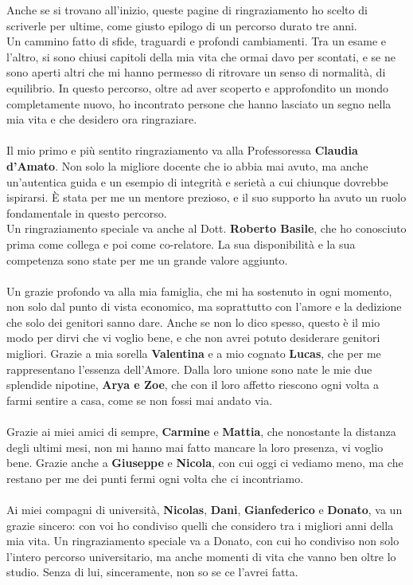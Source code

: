 Anche se si trovano all'inizio, queste pagine di ringraziamento ho scelto di scriverle per ultime, come giusto epilogo di un percorso durato tre anni.
\\
Un cammino fatto di sfide, traguardi e profondi cambiamenti. Tra un esame e l’altro, si sono chiusi capitoli della mia vita che ormai davo per scontati, e se ne sono aperti altri che mi hanno permesso di ritrovare un senso di normalità, di equilibrio.
In questo percorso, oltre ad aver scoperto e approfondito un mondo completamente nuovo, ho incontrato persone che hanno lasciato un segno nella mia vita e che desidero ora ringraziare.
\\\\
Il mio primo e più sentito ringraziamento va alla Professoressa \textbf{Claudia d’Amato}. Non solo la migliore docente che io abbia mai avuto, ma anche un'autentica guida e un esempio di integrità e serietà a cui chiunque dovrebbe ispirarsi. È stata per me un mentore prezioso, e il suo supporto ha avuto un ruolo fondamentale in questo percorso.
\\
Un ringraziamento speciale va anche al Dott. \textbf{Roberto Basile}, che ho conosciuto prima come collega e poi come co-relatore. La sua disponibilità e la sua competenza sono state per me un grande valore aggiunto.
\\\\
Un grazie profondo va alla mia famiglia, che mi ha sostenuto in ogni momento, non solo dal punto di vista economico, ma soprattutto con l'amore e la dedizione che solo dei genitori sanno dare. Anche se non lo dico spesso, questo è il mio modo per dirvi che vi voglio bene, e che non avrei potuto desiderare genitori migliori.
Grazie a mia sorella \textbf{Valentina} e a mio cognato \textbf{Lucas}, che per me rappresentano l'essenza dell'Amore.
Dalla loro unione sono nate le mie due splendide nipotine, \textbf{Arya e Zoe}, che con il loro affetto riescono ogni volta a farmi sentire a casa, come se non fossi mai andato via.
\\\\
Grazie ai miei amici di sempre, \textbf{Carmine} e \textbf{Mattia}, che nonostante la distanza degli ultimi mesi, non mi hanno mai fatto mancare la loro presenza, vi voglio bene.
Grazie anche a \textbf{Giuseppe} e \textbf{Nicola}, con cui oggi ci vediamo meno, ma che restano per me dei punti fermi ogni volta che ci incontriamo.
\\\\
Ai miei compagni di università, \textbf{Nicolas}, \textbf{Dani}, \textbf{Gianfederico} e \textbf{Donato}, va un grazie sincero: con voi ho condiviso quelli che considero tra i migliori anni della mia vita. Un ringraziamento speciale va a Donato, con cui ho condiviso non solo l'intero percorso universitario, ma anche momenti di vita che vanno ben oltre lo studio. Senza di lui, sinceramente, non so se ce l'avrei fatta.
